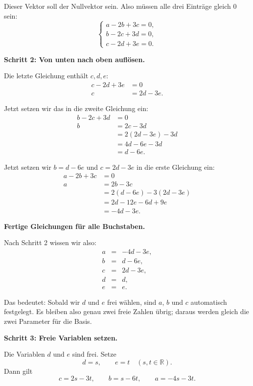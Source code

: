 \documentclass[a4paper,12pt]{article}
\begin{document}
Dieser Vektor soll der Nullvektor sein. Also m\"ussen alle drei Eintr\"age gleich $0$ sein:
\[
\begin{cases}
a-2b+3c=0,\\
b-2c+3d=0,\\
c-2d+3e=0.
\end{cases}
\]

\textbf{Schritt 2: Von unten nach oben aufl\"osen.}

Die letzte Gleichung enth\"alt $c,d,e$:
\begin{align*}
c-2d+3e &= 0 \\
c &= 2d-3e.
\end{align*}

Jetzt setzen wir das in die zweite Gleichung ein:
\begin{align*}
b-2c+3d &= 0 \\
b &= 2c-3d \\
&= 2(2d-3e)-3d \\
&= 4d-6e-3d \\
&= d-6e.
\end{align*}

Jetzt setzen wir $b=d-6e$ und $c=2d-3e$ in die erste Gleichung ein:
\begin{align*}
a-2b+3c &= 0 \\
a &= 2b-3c \\
&= 2(d-6e)-3(2d-3e) \\
&= 2d-12e-6d+9e \\
&= -4d-3e.
\end{align*}

\textbf{Fertige Gleichungen f\"ur alle Buchstaben.}

Nach Schritt 2 wissen wir also:
\[
\begin{array}{rcl}
a &=& -4d-3e,\\
b &=& d-6e,\\
c &=& 2d-3e,\\
d &=& d,\\
e &=& e.
\end{array}
\]

Das bedeutet: Sobald wir $d$ und $e$ frei w\"ahlen, sind $a$, $b$ und $c$ automatisch festgelegt.
Es bleiben also genau zwei freie Zahlen \"ubrig; daraus werden gleich die zwei Parameter f\"ur die Basis.

\textbf{Schritt 3: Freie Variablen setzen.}

Die Variablen $d$ und $e$ sind frei. Setze
\[
d=s,\qquad e=t
\quad (s,t\in\mathbb{R}).
\]
Dann gilt
\[
c=2s-3t,\qquad b=s-6t,\qquad a=-4s-3t.
\]
\end{document}
